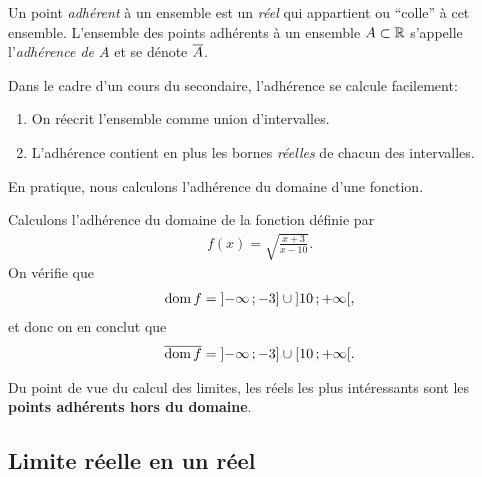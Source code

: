 \documentclass[main.tex]{subfiles}
\begin{document}
Un point \emph{adhérent} à un ensemble est un \emph{réel} qui appartient ou ``colle'' à cet ensemble.
L'ensemble des points adhérents à un ensemble $A \subset \mathbb{R}$
s'appelle l'\emph{adhérence de $A$} et se dénote $\overline{A}$.

Dans le cadre d'un cours du secondaire,
l'adhérence se calcule facilement:
\begin{howto}

    \begin{enumerate}
        \item On réecrit l'ensemble comme union d'intervalles.
        \item L'adhérence contient en plus les bornes \emph{réelles} de chacun des intervalles.
    \end{enumerate}
\end{howto}

En pratique,
nous calculons l'adhérence du domaine d'une fonction.

\begin{example}

    Calculons l'adhérence du domaine de la fonction définie par
    \begin{align}
        f(x) = \sqrt{\frac {x + 3}{x - 10}}.
    \end{align}
    On vérifie que
    \begin{align}
        \operatorname{dom} f = \mathopen{]}-\infty\,;-3\mathclose{]} \cup \mathopen{]}10\,;+\infty\mathclose{[},
    \end{align}
    et donc on en conclut que
    \begin{align}
        \overline{\operatorname{dom} f} = \mathopen{]}-\infty\,;-3\mathclose{]} \cup \mathopen{[}10\,;+\infty\mathclose{[}.
    \end{align}
\end{example}

Du point de vue du calcul des limites,
les réels les plus intéressants sont les \textbf{points adhérents hors du domaine}.

\subsection{Limite réelle en un réel}
\end{document}
